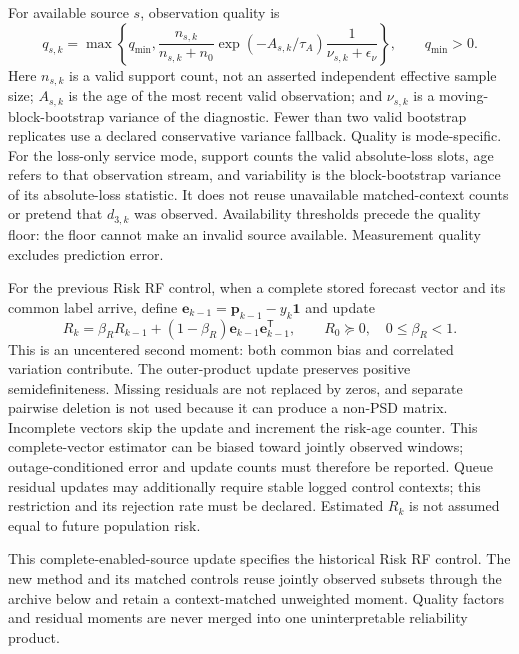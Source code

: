\documentclass[10pt]{article}
\begin{document}
For available source $s$, observation quality is
\begin{equation}
 q_{s,k}=\max\left\{q_{\min},
 \frac{n_{s,k}}{n_{s,k}+n_0}
 \exp(-A_{s,k}/\tau_A)\frac1{\nu_{s,k}+\epsilon_\nu}\right\},
 \qquad q_{\min}>0.
 \label{eq:quality-only}
\end{equation}
Here $n_{s,k}$ is a valid support count, not an asserted independent effective
sample size; $A_{s,k}$ is the age of the most recent valid observation; and
$\nu_{s,k}$ is a moving-block-bootstrap variance of the diagnostic. Fewer than
two valid bootstrap replicates use a declared conservative variance fallback.
Quality is mode-specific. For the loss-only service mode, support counts the
valid absolute-loss slots, age refers to that observation stream, and variability
is the block-bootstrap variance of its absolute-loss statistic. It does not
reuse unavailable matched-context counts or pretend that $d_{3,k}$ was observed.
Availability thresholds precede the quality floor: the floor cannot make an
invalid source available. Measurement quality excludes prediction error.

For the previous Risk RF control, when a complete stored forecast vector and
its common label arrive, define
$\boldsymbol e_{k-1}=\boldsymbol p_{k-1}-y_k\boldsymbol1$ and update
\begin{equation}
 R_k=\beta_R R_{k-1}+(1-\beta_R)
             \boldsymbol e_{k-1}\boldsymbol e_{k-1}^{\mathsf T},
 \qquad R_0\succeq0,\quad0\le\beta_R<1.
 \label{eq:residual-update}
\end{equation}
This is an uncentered second moment: both common bias and correlated variation
contribute. The outer-product update preserves positive semidefiniteness.
Missing residuals are not replaced by zeros, and separate pairwise deletion is
not used because it can produce a non-PSD matrix. Incomplete vectors skip the
update and increment the risk-age counter. This complete-vector estimator can
be biased toward jointly observed windows; outage-conditioned error and update
counts must therefore be reported. Queue residual updates may additionally
require stable logged control contexts; this restriction and its rejection
rate must be declared. Estimated $R_k$ is not assumed equal to future population
risk.

This complete-enabled-source update specifies the historical Risk RF control.
The new method and its matched controls reuse jointly observed subsets through
the archive below and retain a context-matched unweighted moment. Quality factors and residual moments are never merged into one
uninterpretable reliability product.
\end{document}
